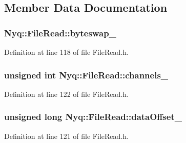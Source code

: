 \subsection{Member Data Documentation}
\subsubsection[{\texorpdfstring{byteswap\+\_\+}{byteswap_}}]{ Nyq\+::\+File\+Read\+::byteswap\+\_\+\hspace{0.3cm}{\ttfamily [protected]}}\hypertarget{class_nyq_1_1_file_read_a036ded8650f3616cb5c278a290261bb6}{}\label{class_nyq_1_1_file_read_a036ded8650f3616cb5c278a290261bb6}


Definition at line 118 of file File\+Read.\+h.

\subsubsection[{\texorpdfstring{channels\+\_\+}{channels_}}]{\setlength{\rightskip}{0pt plus 5cm}unsigned {\bf int} Nyq\+::\+File\+Read\+::channels\+\_\+\hspace{0.3cm}{\ttfamily [protected]}}\hypertarget{class_nyq_1_1_file_read_a8726d7b043c7ef91414e635d1a87a984}{}\label{class_nyq_1_1_file_read_a8726d7b043c7ef91414e635d1a87a984}


Definition at line 122 of file File\+Read.\+h.

\subsubsection[{\texorpdfstring{data\+Offset\+\_\+}{dataOffset_}}]{\setlength{\rightskip}{0pt plus 5cm}unsigned long Nyq\+::\+File\+Read\+::data\+Offset\+\_\+\hspace{0.3cm}{\ttfamily [protected]}}\hypertarget{class_nyq_1_1_file_read_ad6ba31c1d2ee7dd2ec0def9f92571f43}{}\label{class_nyq_1_1_file_read_ad6ba31c1d2ee7dd2ec0def9f92571f43}


Definition at line 121 of file File\+Read.\+h.

